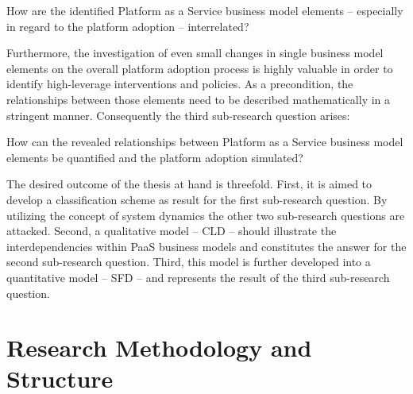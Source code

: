 \begin{SRQ}\label{srq2}
How are the identified Platform as a Service business model elements -- especially in regard to the platform adoption -- interrelated?
\end{SRQ}

Furthermore, the investigation of even small changes in single business model elements on the overall platform adoption process is highly valuable in order to identify high-leverage interventions and policies. As a precondition, the relationships between those elements need to be described mathematically in a stringent manner. Consequently the third sub-research question arises:

\begin{SRQ}\label{srq3}
How can the revealed relationships between Platform as a Service business model elements be quantified and the platform adoption simulated?
\end{SRQ}

The desired outcome of the thesis at hand is threefold. First, it is aimed to develop a classification scheme as result for the first sub-research question. By utilizing the concept of system dynamics the other two sub-research questions are attacked. Second, a qualitative model -- \acf{CLD} -- should illustrate the interdependencies within \ac{PaaS} business models and constitutes the answer for the second sub-research question. Third, this model is further developed into a quantitative model -- \acf{SFD} -- and represents the result of the third sub-research question.
	
\section{Research Methodology and Structure}\label{ch:intro:met}

